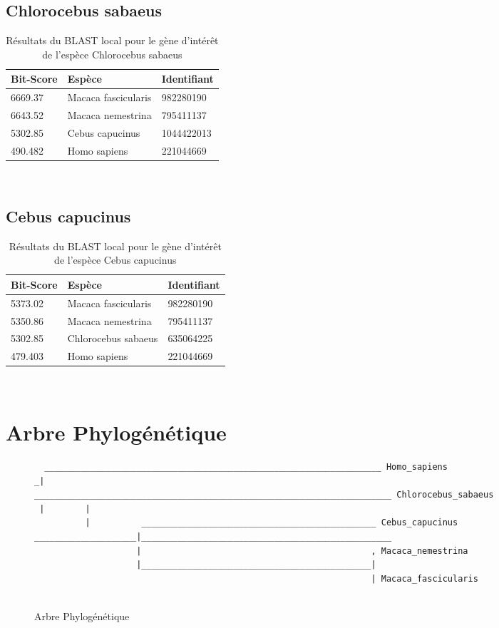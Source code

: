 \documentclass[a4paper]{article}
\begin{document}
\begin{multicols}{2}
\subsection{Chlorocebus sabaeus}
\begin{table}[H]
\small\sf\centering
\caption{Résultats du BLAST local pour le gène d'intérêt de l'espèce Chlorocebus sabaeus}
\begin{tabular}{lll}
\toprule
Bit-Score&Espèce&Identifiant\\
\midrule
6669.37 & Macaca fascicularis & 982280190\\
6643.52 & Macaca nemestrina & 795411137\\
5302.85 & Cebus capucinus & 1044422013\\
490.482 & Homo sapiens & 221044669\\

\bottomrule
\end{tabular}\\[10pt]
\end{table}

\subsection{Cebus capucinus}
\begin{table}[H]
\small\sf\centering
\caption{Résultats du BLAST local pour le gène d'intérêt de l'espèce Cebus capucinus}
\begin{tabular}{lll}
\toprule
Bit-Score&Espèce&Identifiant\\
\midrule
5373.02 & Macaca fascicularis & 982280190\\
5350.86 & Macaca nemestrina & 795411137\\
5302.85 & Chlorocebus sabaeus & 635064225\\
479.403 & Homo sapiens & 221044669\\

\bottomrule
\end{tabular}\\[10pt]
\end{table}

\end{multicols}


\section{Arbre Phylogénétique}
\begin{figure}[H]
\begin{verbatim}
  __________________________________________________________________ Homo_sapiens
_|
______________________________________________________________________ Chlorocebus_sabaeus
 |        |
          |          ______________________________________________ Cebus_capucinus
____________________|_________________________________________________
                    |                                             , Macaca_nemestrina
                    |_____________________________________________|
                                                                  | Macaca_fascicularis


\end{verbatim}
\caption{Arbre Phylogénétique}
\label{arbrephylogénétique}
\end{figure}
\end{document}

